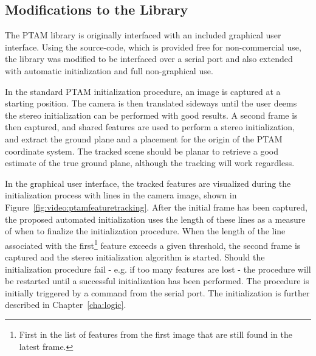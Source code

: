         \subsection{Modifications to the Library}
            The PTAM library is originally interfaced with an included graphical user interface.
            Using the source-code, which is provided free for non-commercial use, the
            library was modified to be interfaced over a serial port
            and also extended with automatic initialization and full non-graphical use.

            In the standard PTAM initialization procedure, an image is captured
            at a starting position. The camera is then translated sideways until the user
            deems the stereo initialization can be performed with good results.
            A second frame is then captured, and shared features are used
            to perform a stereo initialization, and extract the ground plane
            and a placement for the origin of the PTAM coordinate system.
            The tracked scene should be planar to retrieve a good estimate
            of the true ground plane, although the tracking will work regardless.


            In the graphical user interface, the tracked features are visualized
            during the initialization process with lines in the camera image,
            shown in Figure~\ref{fig:video:ptamfeaturetracking}.
            After the initial frame has been captured, the proposed
            automated initialization uses the length of these lines as
            a measure of when to finalize the initialization procedure.
            When the length of the line associated with the first\footnote{First in the list of features from the first image that are still found in the latest frame.}
            feature exceeds a given threshold, the second frame is
            captured and the stereo initialization algorithm is started.
            Should the initialization procedure fail - e.g. if too many features are lost - the
            procedure will be restarted until a successful initialization has been performed.
            The procedure is initially triggered by a command from the serial port.
            The initialization is further described in Chapter~\ref{cha:logic}.

